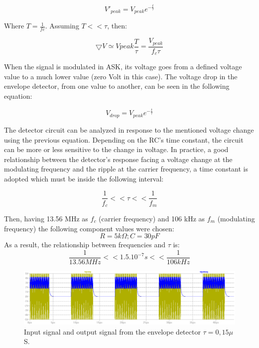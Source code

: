 \documentclass{article} %
\begin{document}
\begin{multicols}{2}
\begin{equation} \label{eq:vref}
V'_{peak} = V_{peak}e^{-\frac{t}{\tau}}
\end{equation}

Where $T = \frac{1}{fc}$. Assuming $T << \tau$, then:

\begin{equation} \label{eq:vref}
{\bigtriangledown V} \simeq V{peak}\frac{T}{\tau} = \frac{V_{peak}}{f_c \tau}
\end{equation}


When the signal is modulated in ASK, its voltage goes from a defined voltage value to a much lower value (zero Volt in this case). The voltage drop in the envelope detector, from one value to another, can be seen in the following equation:

\begin{equation} \label{eq:vref}
V_{drop} = V_{peak}e^{-\frac{t}{\tau}}
\end{equation}


The detector circuit can be analyzed in response to the mentioned voltage change  using the previous equation. Depending on the RC’s time constant, the circuit can be more or less sensitive to the change in voltage. In practice, a good relationship between the detector’s response facing a voltage change at the modulating frequency and the ripple at the carrier frequency, a time constant is adopted which must be inside the following interval:

\begin{equation} \label{eq:tauRC}
   \frac{1}{f_c} << \tau << \frac{1}{f_m}
\end{equation}

Then, having 13.56 MHz as $f_c$ (carrier frequency) and 106 kHz as $f_m$ (modulating frequency) the following component values were chosen:
$$R = 5 k\Omega ; C = 30 pF$$
As a result, the relationship between frequencies and $\tau$ is:
$$\frac{1}{13.56MHz}<<1.5.10^{-7}s<<\frac{1}{106kHz}$$

\begin{figure}[H]
\centering
\includegraphics[scale=0.2]{Images/ImagenesTesina/Antecedentes/Sim_Detect.png}
\caption{Input signal and output signal from the envelope detector $\tau = 0,15\mu$ S.}
\label{fig:Sim_detect}
\end{figure}
 

\end{multicols}
\end{document}
